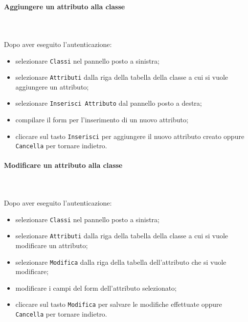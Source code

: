 \paragraph{Aggiungere un attributo alla classe} \mbox{}\\ \mbox{}\\
Dopo aver eseguito l'autenticazione:
\begin{itemize}
	\item selezionare \texttt{Classi} nel pannello posto a sinistra;
	\item selezionare \texttt{Attributi} dalla riga della tabella della classe
		a cui si vuole aggiungere un attributo;
	\item selezionare \texttt{Inserisci Attributo} dal pannello posto a destra;
	\item compilare il form per l'inserimento di un nuovo attributo;
	\item cliccare sul tasto \texttt{Inserisci} per aggiungere il nuovo attributo 
		creato oppure \texttt{Cancella} per tornare indietro.	
\end{itemize}

\paragraph{Modificare un attributo alla classe} \mbox{}\\ \mbox{}\\
Dopo aver eseguito l'autenticazione:
\begin{itemize}
	\item selezionare \texttt{Classi} nel pannello posto a sinistra;
	\item selezionare \texttt{Attributi} dalla riga della tabella della classe
		a cui si vuole modificare un attributo;\
	\item selezionare \texttt{Modifica} dalla riga della tabella dell'attributo
		che si vuole modificare;
	\item modificare i campi del form dell'attributo selezionato;
	\item cliccare sul tasto \texttt{Modifica} per salvare le modifiche effettuate
		oppure \texttt{Cancella} per tornare indietro.
\end{itemize}

